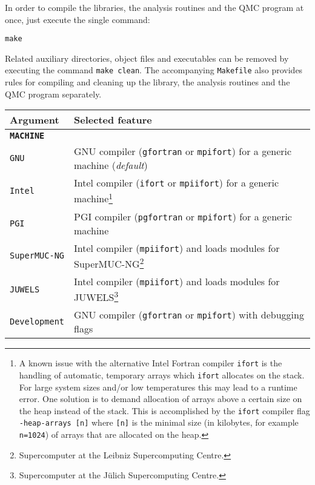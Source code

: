 In order to compile the libraries, the analysis routines and the QMC program at once, just execute the single command:%
\begin{lstlisting}[style=bash,morekeywords={make}]
make
\end{lstlisting}
Related auxiliary directories, object files and executables can be removed by executing the command \lstinline[style=bash,morekeywords={make}]{make clean}. The accompanying \texttt{Makefile} also provides rules for compiling and cleaning up the library, the analysis routines and the QMC program separately.  

\begin{table}[!ht]
	\begin{center}
		\begin{tabular}{@{} p{} p{} @{}}\toprule %
			Argument & Selected feature \\\midrule
			\textbf{\texttt{MACHINE}} &  \\\midrule
			\texttt{GNU}  &   GNU compiler (\texttt{gfortran} or \texttt{mpifort}) for a generic machine (\emph{default}) \\
			\texttt{Intel}  &   Intel compiler (\texttt{ifort} or \texttt{mpiifort}) for a generic machine\footnote{A known issue with the alternative Intel Fortran compiler \texttt{ifort} is the handling of automatic, temporary arrays 
				which \texttt{ifort} allocates on the stack. For large system sizes and/or low temperatures this may lead to a runtime error. One solution is to demand allocation of arrays above a certain size on the heap instead of the stack. This is accomplished by the \texttt{ifort} compiler flag \texttt{-heap-arrays [n]} where \texttt{[n]} is the minimal size (in kilobytes, for example \texttt{n=1024}) of arrays that are allocated on the heap.} \\
			\texttt{PGI}  &   PGI compiler (\texttt{pgfortran} or \texttt{mpifort}) for a generic machine \\
			\texttt{SuperMUC-NG}  &  Intel compiler (\texttt{mpiifort}) and loads modules for SuperMUC-NG\footnote{Supercomputer at the Leibniz Supercomputing Centre.} \\
			\texttt{JUWELS}  &  Intel compiler (\texttt{mpiifort}) and loads modules for JUWELS\footnote{Supercomputer at the J\"ulich Supercomputing Centre.} \\
			\texttt{Development}  &  GNU compiler (\texttt{gfortran} or \texttt{mpifort}) with debugging flags \vspace{7pt}\\
			

\end{tabular}
\end{center}
\end{table}
